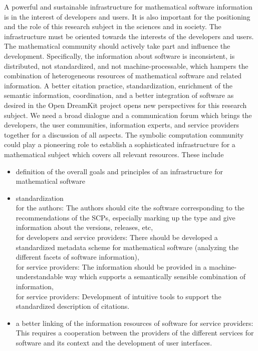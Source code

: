 \documentclass[12pt]{article}
\begin{document}
A powerful and sustainable infrastructure for mathematical software information is in the interest of  developers and  users.  It is also important for the positioning and the role of this research subject in the sciences and in society.  The infrastructure must be oriented towards the interests  of the developers and users. The mathematical community  should actively take part and influence the development.
Specifically, the information about software is inconsistent, is distributed, not standardized, and not machine-processable, which hampers the combination of heterogeneous resources of mathematical software and related information. A better citation practice, standardization, enrichment of the semantic information, coordination, and a better integration of software as desired in the Open DreamKit project \cite{OpenDreamKit}  opens new perspectives for this research subject.
We need a broad dialogue and a communication forum which brings the developers, the user communities, information experts, and service providers together for a  discussion of all aspects. The symbolic computation community could play a pioneering role to establish a sophisticated infrastructure for a mathematical subject which covers all relevant resources. These include
\begin{itemize}
\item{definition of the overall goals and principles of an infrastructure for mathematical software}\\
\item{standardization}\\
for the authors: The authors should cite the software corresponding to the recommendations of the SCPs, especially marking up the type and give information about the versions, releases, etc,\\
for developers and service providers: There should be developed a standardized metadata scheme for mathematical software (analyzing the different facets of software information),\\
for service providers: The information should be provided in a machine-understandable way which supports a semantically sensible combination of information,\\
for service providers: Development of intuitive tools to support the standardized description of citations.
\item{a better linking of the information resources of software}
for service providers: This requires a cooperation between the providers of the different services for software and its context and the development of user interfaces.
\end{itemize}
\end{document}
